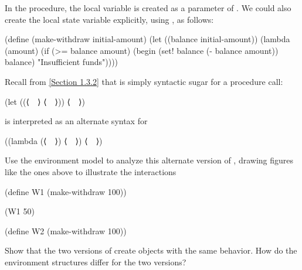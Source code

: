 \begin{exercise}
	\label{Exercise 3.10}
	In the  procedure, the local variable  is created as a parameter of .
	We could also create the local state variable explicitly, using , as follows:
	\begin{scheme}
	  (define (make-withdraw initial-amount)
	    (let ((balance initial-amount))
	      (lambda (amount)
	        (if (>= balance amount)
	            (begin (set! balance (- balance amount))
	                   balance)
	            "Insufficient funds"))))
	\end{scheme}
	Recall from \cref{Section 1.3.2} that  is simply syntactic sugar for a
	procedure call:
	\begin{scheme}
	  (let ((⟨~~⟩ ⟨~~⟩)) ⟨~~⟩)
	\end{scheme}
	is interpreted as an alternate syntax for
	\begin{scheme}
	  ((lambda (⟨~~⟩) ⟨~~⟩) ⟨~~⟩)
	\end{scheme}
	Use the environment model to analyze this alternate version of , drawing figures like the ones above to illustrate the interactions
	\begin{scheme}
	  (define W1 (make-withdraw 100))

	  (W1 50)

	  (define W2 (make-withdraw 100))
	\end{scheme}
	Show that the two versions of  create objects with the same behavior.
	How do the environment structures differ for the two versions?
\end{exercise}
